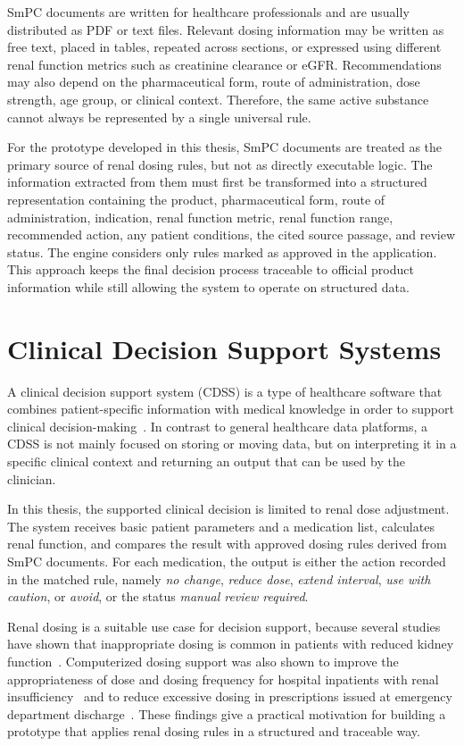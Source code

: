 \documentclass[12pt,a4paper,twoside]{book}
\begin{document}
SmPC documents are written for healthcare professionals and are usually distributed as PDF or text files.
Relevant dosing information may be written as free text, placed in tables, repeated across sections, or expressed using different renal function metrics such as creatinine clearance or eGFR. 
Recommendations may also depend on the pharmaceutical form, route of administration, dose strength, age group, or clinical context. 
Therefore, the same active substance cannot always be represented by a single universal rule.

For the prototype developed in this thesis, SmPC documents are treated as the primary source of renal dosing rules, but not as directly executable logic.
The information extracted from them must first be transformed into a structured representation containing the product, pharmaceutical form, route of administration, indication, renal function metric, renal function range, recommended action, any patient conditions, the cited source passage, and review status.
The engine considers only rules marked as approved in the application.
This approach keeps the final decision process traceable to official product information while still allowing the system to operate on structured data.

\section{Clinical Decision Support Systems}\label{sec:cdss}

A clinical decision support system (CDSS) is a type of healthcare software that combines patient-specific information with medical knowledge in order to support clinical decision-making~\cite{artSutton2020CDSSOverview}.
In contrast to general healthcare data platforms, a CDSS is not mainly focused on storing or moving data, but on interpreting it in a specific clinical context and returning an output that can be used by the clinician.

In this thesis, the supported clinical decision is limited to renal dose adjustment. 
The system receives basic patient parameters and a medication list, calculates renal function, and compares the result with approved dosing rules derived from SmPC documents.
For each medication, the output is either the action recorded in the matched rule, namely \textit{no change}, \textit{reduce dose}, \textit{extend interval}, \textit{use with caution}, or \textit{avoid}, or the status \textit{manual review required}.

Renal dosing is a suitable use case for decision support, because several studies have shown that inappropriate dosing is common in patients with reduced kidney function~\cite{artChertow2001GuidedMedicationDosing,artTerrell2010CDSSRenalDosing}.
Computerized dosing support was also shown to improve the appropriateness of dose and dosing frequency for hospital inpatients with renal insufficiency~\cite{artChertow2001GuidedMedicationDosing} and to reduce excessive dosing in prescriptions issued at emergency department discharge~\cite{artTerrell2010CDSSRenalDosing}.
These findings give a practical motivation for building a prototype that applies renal dosing rules in a structured and traceable way.
\end{document}
